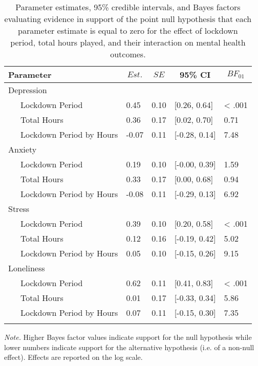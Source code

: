 \documentclass[
  english,
  man,floatsintext]{apa6}
\begin{document}
\begin{table}[!htbp]

\begin{center}
\begin{threeparttable}

\caption{\label{tab:study-one-mh-bayes-pre-post}Parameter estimates, 95\% credible intervals, and Bayes factors evaluating evidence in support of the point null hypothesis that each parameter estimate is equal to zero for the effect of lockdown period, total hours played, and their interaction on mental health outcomes.}

\begin{tabular}{lllll}
\toprule
Parameter & \multicolumn{1}{c}{$Est.$} & \multicolumn{1}{c}{$SE$} & \multicolumn{1}{c}{95\% CI} & \multicolumn{1}{c}{$BF_{01}$}\\
\midrule
Depression &  &  &  & \\
\ \ \ Lockdown Period & 0.45 & 0.10 & {}[0.26, 0.64] & < .001\\
\ \ \ Total Hours & 0.36 & 0.17 & {}[0.02, 0.70] & 0.71\\
\ \ \ Lockdown Period by Hours & -0.07 & 0.11 & {}[-0.28, 0.14] & 7.48\\
Anxiety &  &  &  & \\
\ \ \ Lockdown Period & 0.19 & 0.10 & {}[-0.00, 0.39] & 1.59\\
\ \ \ Total Hours & 0.33 & 0.17 & {}[0.00, 0.68] & 0.94\\
\ \ \ Lockdown Period by Hours & -0.08 & 0.11 & {}[-0.29, 0.13] & 6.92\\
Stress &  &  &  & \\
\ \ \ Lockdown Period & 0.39 & 0.10 & {}[0.20, 0.58] & < .001\\
\ \ \ Total Hours & 0.12 & 0.16 & {}[-0.19, 0.42] & 5.02\\
\ \ \ Lockdown Period by Hours & 0.05 & 0.10 & {}[-0.15, 0.26] & 9.15\\
Loneliness &  &  &  & \\
\ \ \ Lockdown Period & 0.62 & 0.11 & {}[0.41, 0.83] & < .001\\
\ \ \ Total Hours & 0.01 & 0.17 & {}[-0.33, 0.34] & 5.86\\
\ \ \ Lockdown Period by Hours & 0.07 & 0.11 & {}[-0.15, 0.30] & 7.35\\
\bottomrule
\addlinespace
\end{tabular}

\begin{tablenotes}[para]
\normalsize{\textit{Note.} Higher Bayes factor values indicate support for the null hypothesis while lower numbers indicate support for the alternative hypothesis (i.e. of a non-null effect). Effects are reported on the log scale.}
\end{tablenotes}

\end{threeparttable}
\end{center}

\end{table}
\end{document}
